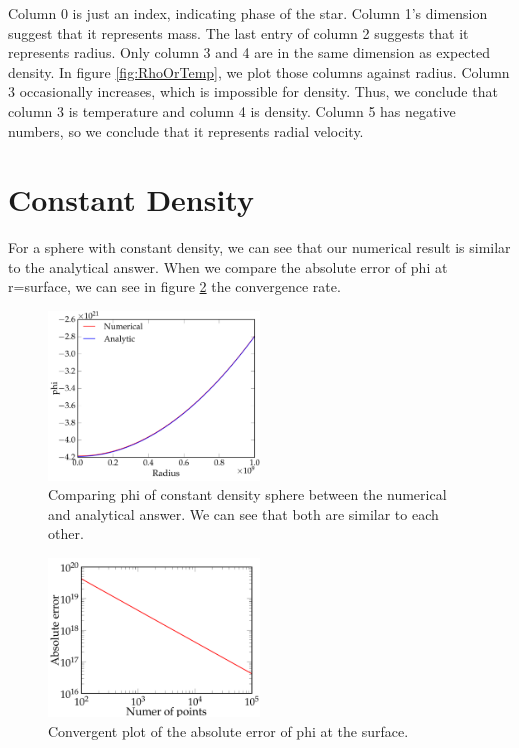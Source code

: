 \documentclass[11pt,letterpaper]{article}
\begin{document}
Column 0 is just an index, indicating phase of the star. Column 1's dimension suggest that it represents mass. The last entry of column 2 suggests that it represents radius.
Only column 3 and 4 are in the same dimension as expected density. In figure \ref{fig:RhoOrTemp}, we plot those columns against radius. Column 3 occasionally increases, which is impossible for density. Thus, we conclude that column 3 is temperature and column 4 is density.
Column 5 has negative numbers, so we conclude that it represents radial velocity.

\section{Constant Density}

For a sphere with constant density, we can see that our numerical result is similar to the analytical answer. When we compare the absolute error of phi at r=surface, we can see in figure \ref{fig:ConverPlot} the convergence rate.

\begin{figure}[h!]
	\centering
	\includegraphics[width=0.5\textwidth]{ConRho}
	\caption{Comparing phi of constant density sphere between the numerical and analytical answer. We can see that both are similar to each other.}
	\label{fig:ConRho}
\end{figure}

\begin{figure}[h!]
	\centering
	\includegraphics[width=0.5\textwidth]{ConverPlot}
	\caption{Convergent plot of the absolute error of phi at the surface.}
	\label{fig:ConverPlot}
\end{figure}
\end{document}
